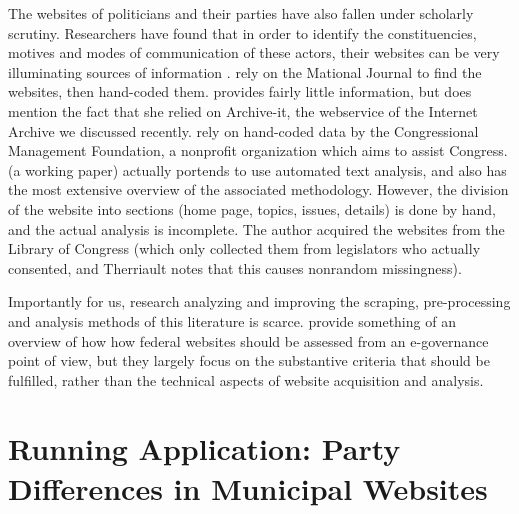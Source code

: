 \documentclass[11pt]{article}
\begin{document}
The websites of politicians and their parties have also fallen under scholarly scrutiny. Researchers have found that in order to identify the constituencies, motives and modes of communication of these actors, their websites can be very illuminating sources of information \citep{Druckman2009,Druckman2010,Cryer2017,Esterling2011,Esterling2011a,Norris2003,Therriault2010}. \cite{Druckman2009,Druckman2010} rely on the Mational Journal to find the websites, then hand-coded them. \cite{Cryer2017} provides fairly little information, but does mention the fact that she relied on Archive-it, the webservice of the Internet Archive we discussed recently. \cite{Esterling2011,Esterling2011a} rely on hand-coded data by the Congressional Management Foundation, a nonprofit organization which aims to assist Congress. \cite{Therriault2010} (a working paper) actually portends to use automated text analysis, and also has the most extensive overview of the associated methodology. However, the division of the website into sections (home page, topics, issues, details) is done by hand, and the actual analysis is incomplete. The author acquired the websites from the Library of Congress (which only collected them from legislators who actually consented, and Therriault notes that this causes nonrandom missingness).

Importantly for us, research analyzing and improving the scraping, pre-processing and analysis methods of this literature is scarce. \cite{Eschenfelder2002} provide something of an overview of how how federal websites should be assessed from an e-governance point of view, but they largely focus on the substantive criteria that should be fulfilled, rather than the technical aspects of website acquisition and analysis.


\section{Running Application: Party Differences in Municipal Websites}
\end{document}
